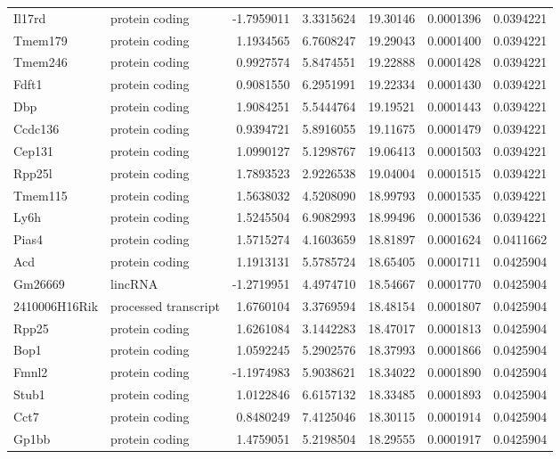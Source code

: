\documentclass[onehalf,12pt]{beavtex}
\begin{document}
\begin{longtable}{llrrrrr}
  Il17rd & protein coding & -1.7959011 & 3.3315624 & 19.30146 & 0.0001396 & 0.0394221\\
  Tmem179 & protein coding & 1.1934565 & 6.7608247 & 19.29043 & 0.0001400 & 0.0394221\\
  Tmem246 & protein coding & 0.9927574 & 5.8474551 & 19.22888 & 0.0001428 & 0.0394221\\
  \addlinespace
  Fdft1 & protein coding & 0.9081550 & 6.2951991 & 19.22334 & 0.0001430 & 0.0394221\\
  Dbp & protein coding & 1.9084251 & 5.5444764 & 19.19521 & 0.0001443 & 0.0394221\\
  Ccdc136 & protein coding & 0.9394721 & 5.8916055 & 19.11675 & 0.0001479 & 0.0394221\\
  Cep131 & protein coding & 1.0990127 & 5.1298767 & 19.06413 & 0.0001503 & 0.0394221\\
  Rpp25l & protein coding & 1.7893523 & 2.9226538 & 19.04004 & 0.0001515 & 0.0394221\\
  \addlinespace
  Tmem115 & protein coding & 1.5638032 & 4.5208090 & 18.99793 & 0.0001535 & 0.0394221\\
  Ly6h & protein coding & 1.5245504 & 6.9082993 & 18.99496 & 0.0001536 & 0.0394221\\
  Pias4 & protein coding & 1.5715274 & 4.1603659 & 18.81897 & 0.0001624 & 0.0411662\\
  Acd & protein coding & 1.1913131 & 5.5785724 & 18.65405 & 0.0001711 & 0.0425904\\
  Gm26669 & lincRNA & -1.2719951 & 4.4974710 & 18.54667 & 0.0001770 & 0.0425904\\
  \addlinespace
  2410006H16Rik & processed transcript & 1.6760104 & 3.3769594 & 18.48154 & 0.0001807 & 0.0425904\\
  Rpp25 & protein coding & 1.6261084 & 3.1442283 & 18.47017 & 0.0001813 & 0.0425904\\
  Bop1 & protein coding & 1.0592245 & 5.2902576 & 18.37993 & 0.0001866 & 0.0425904\\
  Fmnl2 & protein coding & -1.1974983 & 5.9038621 & 18.34022 & 0.0001890 & 0.0425904\\
  Stub1 & protein coding & 1.0122846 & 6.6157132 & 18.33485 & 0.0001893 & 0.0425904\\
  \addlinespace
  Cct7 & protein coding & 0.8480249 & 7.4125046 & 18.30115 & 0.0001914 & 0.0425904\\
  Gp1bb & protein coding & 1.4759051 & 5.2198504 & 18.29555 & 0.0001917 & 0.0425904\\

\end{longtable}
\end{document}
